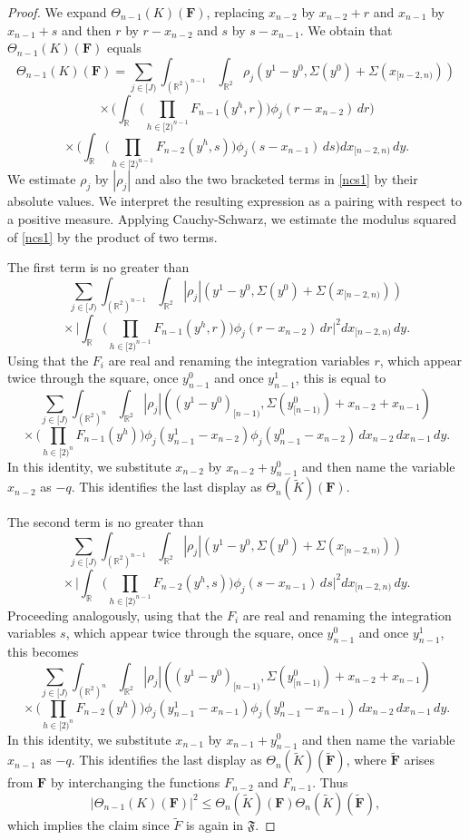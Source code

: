 \documentclass[12pt,reqno]{amsart}
\theoremstyle{plain}
\numberwithin{equation}{section}
\theoremstyle{remark}
\newcommand{\R}{{\mathbb R}}
\newcommand{\F}{\mathbf{F}}
\begin{document}
\begin{proof}
We expand $\Theta_{n-1}(K)(\F)$, replacing $x_{n-2}$ by $x_{n-2}+r$ and $x_{n-1}$ by $x_{n-1}+s$
and then $r$ by $r-x_{n-2}$ and $s$ by $s-x_{n-1}$. We obtain that $\Theta_{n-1}(K)(\F)$ equals
\begin{equation}\label{ncs1}
\Theta_{n-1}(K)(\F)=\sum_{j\in[J)} \int_{(\R^2)^{n-1}} \int_{\R^2}
\rho_j(y^1-y^0, \Sigma(y^0)+\Sigma(x_{[n-2,n)}))
\end{equation}
\[
{}\times \Big( \int_{\R} \Big(\prod_{h\in [2)^{n-1}} F_{n-1}(y^h,r)\Big)
\phi_j(r-x_{n-2})\,dr\Big)
\]
\[
{}\times \Big( \int_{\R} \Big(\prod_{h\in [2)^{n-1}} F_{n-2}(y^h,s)\Big)
\phi_j(s-x_{n-1})\,ds\Big)
    dx_{[n-2,n)}\,dy .
\]
We estimate $\rho_j$ by $|\rho_j|$ and also the two bracketed terms in \eqref{ncs1} by their absolute values.
We interpret the resulting expression as a pairing with respect to a positive measure.
Applying Cauchy-Schwarz, we estimate the modulus squared of \eqref{ncs1} by the product of two terms.

The first term is no greater than
\[
\sum_{j\in[J)} \int_{(\R^2)^{n-1}} \int_{\R^2}
|\rho_j|(y^1-y^0, \Sigma(y^0)+\Sigma(x_{[n-2,n)}))
\]
\[
{}\times
\Big|
 \int_{\R} \Big(\prod_{h\in [2)^{n-1}} F_{n-1}(y^h,r)\Big)
\phi_j(r-x_{n-2})\,dr
\Big|^2
    dx_{[n-2,n)}\,dy .
\]
Using that the $F_i$ are real and renaming the integration variables $r$, which appear twice
through the square, once $y_{n-1}^0$ and once $y_{n-1}^1$, this is equal to
\[
\sum_{j\in[J)} \int_{(\R^2)^n}\int_{\R^2}
|\rho_j|((y^1-y^0)_{[n-1)},\Sigma(y^0_{[n-1)})+x_{n-2}+x_{n-1})
\]
\[
{}\times
\Big(\prod_{h\in[2)^n}F_{n-1}(y^h)\Big)
\phi_j(y_{n-1}^1-x_{n-2})\phi_j(y_{n-1}^0-x_{n-2})
\,dx_{n-2}\,dx_{n-1}\,dy .
\]
In this identity, we substitute $x_{n-2}$ by $x_{n-2}+y_{n-1}^0$ and then name the variable $x_{n-2}$ as $-q$.
This identifies the last display as $\Theta_n(\tilde K)(\F)$.

The second term is no greater than
\[
\sum_{j\in[J)} \int_{(\R^2)^{n-1}} \int_{\R^2}
|\rho_j|(y^1-y^0, \Sigma(y^0)+\Sigma(x_{[n-2,n)}))
\]
\[
{}\times
\Big|
 \int_{\R} \Big(\prod_{h\in [2)^{n-1}} F_{n-2}(y^h,s)\Big)
\phi_j(s-x_{n-1})\,ds
\Big|^2
    dx_{[n-2,n)}\,dy .
\]
Proceeding analogously, using that the $F_i$ are real and renaming the integration variables $s$, which appear twice
through the square, once $y_{n-1}^0$ and once $y_{n-1}^1$, this becomes
\[
\sum_{j\in[J)} \int_{(\R^2)^n}\int_{\R^2}
|\rho_j|((y^1-y^0)_{[n-1)},\Sigma(y^0_{[n-1)})+x_{n-2}+x_{n-1})
\]
\[
{}\times
\Big(\prod_{h\in[2)^n}F_{n-2}(y^h)\Big)
\phi_j(y_{n-1}^1-x_{n-1})\phi_j(y_{n-1}^0-x_{n-1})
\,dx_{n-2}\,dx_{n-1}\,dy .
\]
In this identity, we substitute $x_{n-1}$ by $x_{n-1}+y_{n-1}^0$ and then name the variable $x_{n-1}$ as $-q$.
This identifies the last display as $\Theta_n(\tilde K)(\mathbf{\tilde F})$, where $\mathbf{\tilde F}$ arises from $\F$ by interchanging the functions $F_{n-2}$ and $F_{n-1}$.
Thus
\begin{equation}
    |\Theta_{n-1}(K)(\F)|^2
    \le \Theta_n(\tilde K)(\F)\Theta_n(\tilde K)(\mathbf{\tilde F}),
\end{equation}
which implies the claim since $\tilde{F}$ is again in $\mathfrak{F}$.
\end{proof}
\end{document}

